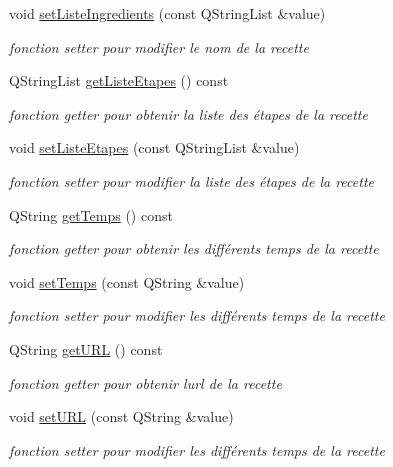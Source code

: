 \begin{DoxyCompactItemize}
void \hyperlink{classRecette_a5d50321b71741def086d7897e2dd62f7}{set\+Liste\+Ingredients} (const Q\+String\+List \&value)
\begin{DoxyCompactList}\small\item\em fonction setter pour modifier le nom de la recette \end{DoxyCompactList}\item 
Q\+String\+List \hyperlink{classRecette_a3b2807fe1f55431bcd632bff2332c6e7}{get\+Liste\+Etapes} () const
\begin{DoxyCompactList}\small\item\em fonction getter pour obtenir la liste des étapes de la recette \end{DoxyCompactList}\item 
void \hyperlink{classRecette_aaf908c155a9b4936b94ca7852232f57d}{set\+Liste\+Etapes} (const Q\+String\+List \&value)
\begin{DoxyCompactList}\small\item\em fonction setter pour modifier la liste des étapes de la recette \end{DoxyCompactList}\item 
Q\+String \hyperlink{classRecette_a9ac38f333d17699fb6601bca332d8567}{get\+Temps} () const
\begin{DoxyCompactList}\small\item\em fonction getter pour obtenir les différents temps de la recette \end{DoxyCompactList}\item 
void \hyperlink{classRecette_a51b797af44e9bc45811e44bd42f461af}{set\+Temps} (const Q\+String \&value)
\begin{DoxyCompactList}\small\item\em fonction setter pour modifier les différents temps de la recette \end{DoxyCompactList}\item 
Q\+String \hyperlink{classRecette_ab06006324a8201e9967b53273dbf2751}{get\+U\+RL} () const
\begin{DoxyCompactList}\small\item\em fonction getter pour obtenir l\textquotesingle{}url de la recette \end{DoxyCompactList}\item 
void \hyperlink{classRecette_ac910b38482d259cba788f41669e765b1}{set\+U\+RL} (const Q\+String \&value)
\begin{DoxyCompactList}\small\item\em fonction setter pour modifier les différents temps de la recette \end{DoxyCompactList}\item 

\end{DoxyCompactItemize}
